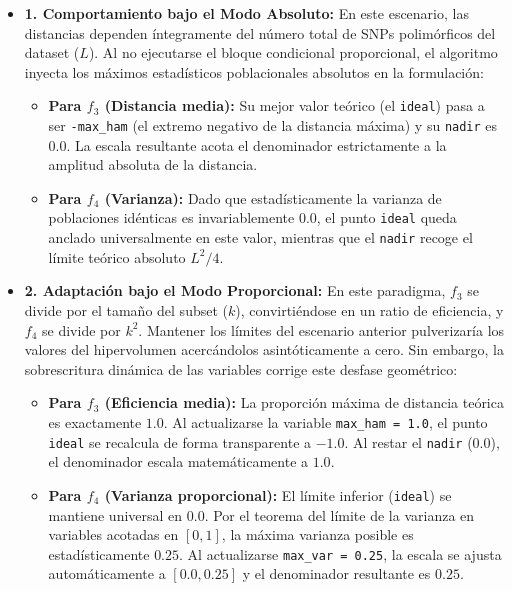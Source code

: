 \documentclass[11pt,a4paper]{article}
\begin{document}
\begin{itemize}
    \item \textbf{1. Comportamiento bajo el Modo Absoluto:} En este escenario, las distancias dependen íntegramente del número total de SNPs polimórficos del dataset ($L$). Al no ejecutarse el bloque condicional proporcional, el algoritmo inyecta los máximos estadísticos poblacionales absolutos en la formulación:
    \begin{itemize}
        \item \textbf{Para $f_3$ (Distancia media):} Su mejor valor teórico (el \texttt{ideal}) pasa a ser \texttt{-max\_ham} (el extremo negativo de la distancia máxima) y su \texttt{nadir} es $0.0$. La escala resultante acota el denominador estrictamente a la amplitud absoluta de la distancia.
        \item \textbf{Para $f_4$ (Varianza):} Dado que estadísticamente la varianza de poblaciones idénticas es invariablemente $0.0$, el punto \texttt{ideal} queda anclado universalmente en este valor, mientras que el \texttt{nadir} recoge el límite teórico absoluto $L^2/4$. 
    \end{itemize}

    \item \textbf{2. Adaptación bajo el Modo Proporcional:} En este paradigma, $f_3$ se divide por el tamaño del subset ($k$), convirtiéndose en un ratio de eficiencia, y $f_4$ se divide por $k^2$. Mantener los límites del escenario anterior pulverizaría los valores del hipervolumen acercándolos asintóticamente a cero. Sin embargo, la sobrescritura dinámica de las variables corrige este desfase geométrico:
    \begin{itemize}
        \item \textbf{Para $f_3$ (Eficiencia media):} La proporción máxima de distancia teórica es exactamente $1.0$. Al actualizarse la variable \texttt{max\_ham = 1.0}, el punto \texttt{ideal} se recalcula de forma transparente a \textbf{$-1.0$}. Al restar el \texttt{nadir} ($0.0$), el denominador escala matemáticamente a $\mathbf{1.0}$.
        \item \textbf{Para $f_4$ (Varianza proporcional):} El límite inferior (\texttt{ideal}) se mantiene universal en \textbf{$0.0$}. Por el teorema del límite de la varianza en variables acotadas en $[0, 1]$, la máxima varianza posible es estadísticamente \textbf{$0.25$}. Al actualizarse \texttt{max\_var = 0.25}, la escala se ajusta automáticamente a $[0.0, 0.25]$ y el denominador resultante es \textbf{$0.25$}.
    \end{itemize}


\end{itemize}
\end{document}
